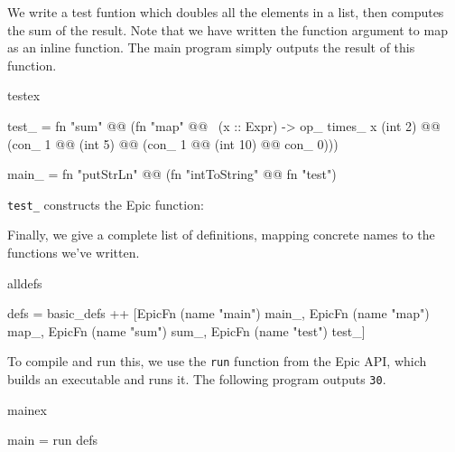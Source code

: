 
We write a test funtion which doubles all the elements in a list, then
computes the sum of the result. Note that we have written the function
argument to map as an inline function. The main program simply outputs
the result of this function.

\begin{SaveVerbatim}{testex}

test_ = fn "sum" @@ 
       (fn "map" @@ \ (x :: Expr) -> op_ times_ x (int 2) 
                 @@ (con_ 1 @@ (int 5) @@
                    (con_ 1 @@ (int 10) @@ con_ 0)))

main_ = fn "putStrLn" @@ (fn "intToString" @@ fn "test")

\end{SaveVerbatim}

\texttt{test\_} constructs the Epic function:


Finally, we give a complete list of definitions, mapping concrete
names to the functions we've written.

\begin{SaveVerbatim}{alldefs}

defs = basic_defs ++ [EpicFn (name "main") main_, 
                      EpicFn (name "map") map_,
                      EpicFn (name "sum") sum_,
                      EpicFn (name "test") test_]

\end{SaveVerbatim}

To compile and run this, we use the \texttt{run} function from the
Epic API, which builds an executable and runs it. The following
program outputs \texttt{30}.

\begin{SaveVerbatim}{mainex}

main = run defs

\end{SaveVerbatim}
